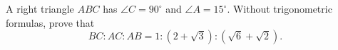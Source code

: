 A right triangle $ABC$ has $\angle C=90^\circ$ and $\angle A=15^\circ$. Without trigonometric formulas, prove that
\[
BC:AC:AB=1:\left(2+\sqrt3\right):\left(\sqrt6+\sqrt2\right).
\]

